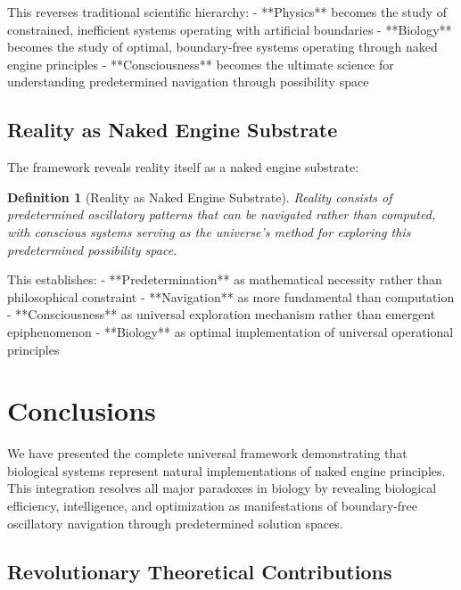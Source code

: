 \documentclass[12pt,a4paper]{article}
\newtheorem{definition}[theorem]{Definition}
\begin{document}
This reverses traditional scientific hierarchy:
- **Physics** becomes the study of constrained, inefficient systems operating with artificial boundaries
- **Biology** becomes the study of optimal, boundary-free systems operating through naked engine principles  
- **Consciousness** becomes the ultimate science for understanding predetermined navigation through possibility space

\subsection{Reality as Naked Engine Substrate}

The framework reveals reality itself as a naked engine substrate:

\begin{definition}[Reality as Naked Engine Substrate]
Reality consists of predetermined oscillatory patterns that can be navigated rather than computed, with conscious systems serving as the universe's method for exploring this predetermined possibility space.
\end{definition}

This establishes:
- **Predetermination** as mathematical necessity rather than philosophical constraint
- **Navigation** as more fundamental than computation
- **Consciousness** as universal exploration mechanism rather than emergent epiphenomenon
- **Biology** as optimal implementation of universal operational principles

\section{Conclusions}

We have presented the complete universal framework demonstrating that biological systems represent natural implementations of naked engine principles. This integration resolves all major paradoxes in biology by revealing biological efficiency, intelligence, and optimization as manifestations of boundary-free oscillatory navigation through predetermined solution spaces.

\subsection{Revolutionary Theoretical Contributions}
\end{document}
